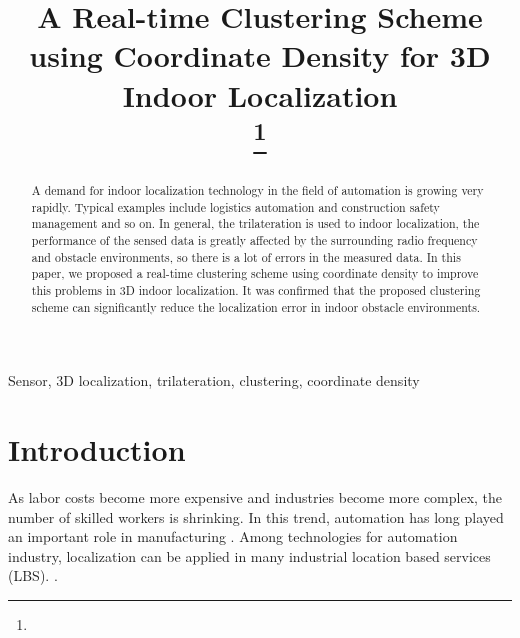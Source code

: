 \documentclass[conference]{IEEEtran}
\begin{document}
\title{A Real-time Clustering Scheme using Coordinate Density for 3D Indoor Localization\\
    \thanks{}}

\author{
    \and
}

\maketitle

\begin{abstract}
    A demand for indoor localization technology in the field of automation is growing very rapidly. Typical examples include logistics automation and construction safety management and so on. In general, the trilateration is used to indoor localization, the performance of the sensed data is greatly affected by the surrounding radio frequency and obstacle environments, so there is a lot of errors in the measured data. In this paper, we proposed a real-time clustering scheme using coordinate density to improve this problems in 3D indoor localization. It was confirmed that the proposed clustering scheme can significantly reduce the localization error in indoor obstacle environments.
\end{abstract}


\begin{IEEEkeywords}
    Sensor, 3D localization, trilateration, clustering, coordinate density
\end{IEEEkeywords}

\section{Introduction}
As labor costs become more expensive and industries become more complex, the number of skilled workers is shrinking. In this trend, automation has long played an important role in manufacturing \cite{b1}. Among technologies for automation industry, localization can be applied in many industrial location based services (LBS). \cite{b2}.
\end{document}
